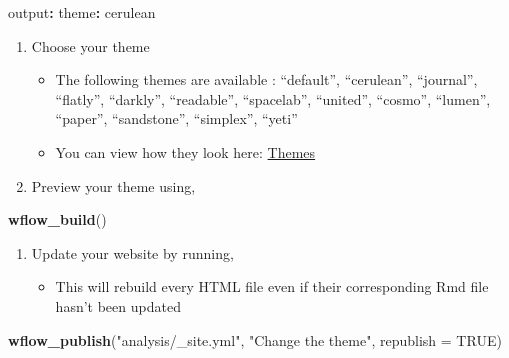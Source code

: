 \documentclass[openany]{article}
\newenvironment{Shaded}{\begin{snugshade}}{\end{snugshade}}
\newcommand{\DataTypeTok}[1]{\textcolor[rgb]{0.13,0.29,0.53}{#1}}
\newcommand{\KeywordTok}[1]{\textcolor[rgb]{0.13,0.29,0.53}{\textbf{#1}}}
\newcommand{\NormalTok}[1]{#1}
\newcommand{\OperatorTok}[1]{\textcolor[rgb]{0.81,0.36,0.00}{\textbf{#1}}}
\newcommand{\OtherTok}[1]{\textcolor[rgb]{0.56,0.35,0.01}{#1}}
\newcommand{\StringTok}[1]{\textcolor[rgb]{0.31,0.60,0.02}{#1}}
\providecommand{\tightlist}{%
  \setlength{\itemsep}{0pt}\setlength{\parskip}{0pt}}
\begin{document}
\begin{Shaded}
\begin{Highlighting}[]
\NormalTok{output}\OperatorTok{:}
\StringTok{    }\NormalTok{theme}\OperatorTok{:}\StringTok{ }\NormalTok{cerulean}
\end{Highlighting}
\end{Shaded}

\begin{enumerate}
\def\labelenumi{\arabic{enumi}.}
\setcounter{enumi}{2}
\tightlist
\item
  Choose your theme

  \begin{itemize}
  \tightlist
  \item
    The following themes are available : ``default'', ``cerulean'', ``journal'', ``flatly'', ``darkly'', ``readable'', ``spacelab'', ``united'', ``cosmo'', ``lumen'', ``paper'', ``sandstone'', ``simplex'', ``yeti''
  \item
    You can view how they look here: \href{https://bootswatch.com/}{Themes}
  \end{itemize}
\item
  Preview your theme using,
\end{enumerate}

\begin{Shaded}
\begin{Highlighting}[]
\KeywordTok{wflow_build}\NormalTok{()}
\end{Highlighting}
\end{Shaded}

\begin{enumerate}
\def\labelenumi{\arabic{enumi}.}
\setcounter{enumi}{4}
\tightlist
\item
  Update your website by running,

  \begin{itemize}
  \tightlist
  \item
    This will rebuild every HTML file even if their corresponding Rmd file hasn't been updated
  \end{itemize}
\end{enumerate}

\begin{Shaded}
\begin{Highlighting}[]
\KeywordTok{wflow_publish}\NormalTok{(}\StringTok{"analysis/_site.yml"}\NormalTok{, }\StringTok{"Change the theme"}\NormalTok{, }\DataTypeTok{republish =} \OtherTok{TRUE}\NormalTok{)}
\end{Highlighting}
\end{Shaded}
\end{document}
